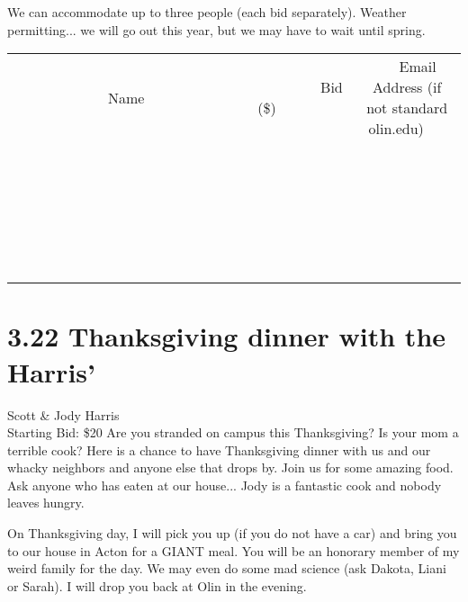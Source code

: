 \documentclass[11pt]{article}
\begin{document}
We can accommodate up to three people (each bid separately).
Weather permitting... we will go out this year, but we may have to wait until spring.
\\[6ex]
\begin{tabular}{c c c}
~~~~~~~~~~~~~Name~~~~~~~~~~~~~ & ~~~~~~~~~Bid (\$)~~~~~~~~~  & ~~~Email Address (if not standard olin.edu)~~~\\
 & & \\
\hline
 & & \\
\hline
 & & \\
\hline
 & & \\
\hline
 & & \\
\hline
 & & \\
\hline
 & & \\
\hline
 & & \\
\hline
 & & \\
\hline
 & & \\
\hline
 & & \\
\hline
 & & \\
\hline
 & & \\
\hline
 & & \\
\hline
 & & \\
\hline
 & & \\
\hline
 & & \\
\hline
 & & \\
\hline
 & & \\
\hline
 & & \\
\hline
 & & \\
\hline
 & & \\
\hline
 & & \\
\hline
 & & \\
\hline
 & & \\
\hline
 & & \\
\hline
\end{tabular}
\newpage
\section*{3.22 Thanksgiving dinner with the Harris'}
Scott \& Jody Harris
\\
Starting Bid: \$20
\newline
Are you stranded on campus this Thanksgiving? Is your mom a terrible cook? Here is a chance to have Thanksgiving dinner with us and our whacky neighbors and anyone else that drops by. Join us for some amazing food. Ask anyone who has eaten at our house... Jody is a fantastic cook and nobody leaves hungry. 

On Thanksgiving day, I will pick you up (if you do not have a car) and bring you to our house in Acton for a GIANT meal. You will be an honorary member of my weird family for the day. We may even do some mad science (ask Dakota, Liani or Sarah). I will drop you back at Olin in the evening.
\end{document}

